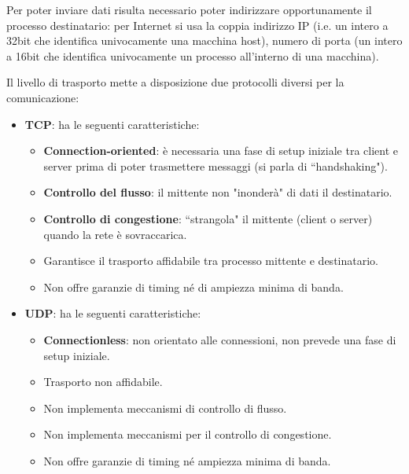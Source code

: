 \documentclass[11pt, italian, openany]{book}
\begin{document}
\begin{sloppypar}
Per poter inviare dati risulta necessario poter indirizzare opportunamente il processo destinatario: per Internet si usa la coppia indirizzo IP (i.e. un
intero a 32bit che identifica univocamente una macchina host), numero di porta (un intero a 16bit che identifica univocamente un processo all'interno di
una macchina).

Il livello di trasporto mette a disposizione due protocolli diversi per la comunicazione:
\begin{itemize}[topsep=0pt]
	\itemsep-0.3em
	\item \textbf{TCP}: ha le seguenti caratteristiche:
	\vspace{-3.5mm}
	\begin{itemize}
		\itemsep-0.3em
		\item \textbf{Connection-oriented}: \`e necessaria una fase di setup iniziale tra client e server prima di poter trasmettere messaggi (si parla
		di ``handshaking").
		\item \textbf{Controllo del flusso}: il mittente non "inonder\`a" di dati il destinatario.
		\item \textbf{Controllo di congestione}: ``strangola" il mittente (client o server) quando la rete è sovraccarica.
		\item Garantisce il trasporto affidabile tra processo mittente e destinatario.
		\item Non offre garanzie di timing n\'e di ampiezza minima di banda.
	\end{itemize}
	\item \textbf{UDP}: ha le seguenti caratteristiche:
	\vspace{-3.5mm}
	\begin{itemize}
		\itemsep-0.3em
		\item \textbf{Connectionless}: non orientato alle connessioni, non prevede una fase di setup iniziale.
		\item Trasporto non affidabile.
		\item Non implementa meccanismi di controllo di flusso.
		\item Non implementa meccanismi per il controllo di congestione.
		\item Non offre garanzie di timing n\'e ampiezza minima di banda.
	\end{itemize}
\end{itemize}


\end{sloppypar}
\end{document}

